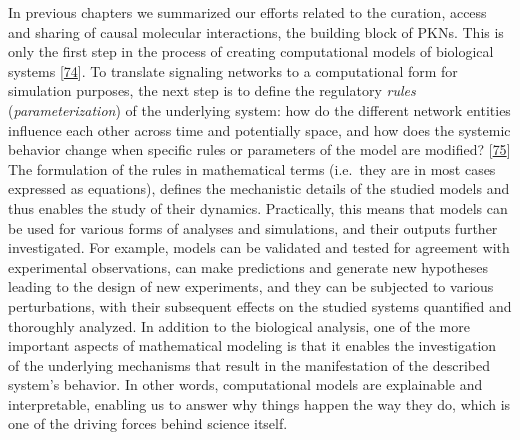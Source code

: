 \documentclass[
  12pt,
]{book}
\begin{document}
In previous chapters we summarized our efforts related to the curation, access and sharing of causal molecular interactions, the building block of PKNs.
This is only the first step in the process of creating computational models of biological systems {[}\protect\hyperlink{ref-Wang2012}{74}{]}.
To translate signaling networks to a computational form for simulation purposes, the next step is to define the regulatory \emph{rules} (\emph{parameterization}) of the underlying system: how do the different network entities influence each other across time and potentially space, and how does the systemic behavior change when specific rules or parameters of the model are modified? {[}\protect\hyperlink{ref-Aldridge2006}{75}{]}
The formulation of the rules in mathematical terms (i.e.~they are in most cases expressed as equations), defines the mechanistic details of the studied models and thus enables the study of their dynamics.
Practically, this means that models can be used for various forms of analyses and simulations, and their outputs further investigated.
For example, models can be validated and tested for agreement with experimental observations, can make predictions and generate new hypotheses leading to the design of new experiments, and they can be subjected to various perturbations, with their subsequent effects on the studied systems quantified and thoroughly analyzed.
In addition to the biological analysis, one of the more important aspects of mathematical modeling is that it enables the investigation of the underlying mechanisms that result in the manifestation of the described system's behavior.
In other words, computational models are explainable and interpretable, enabling us to answer why things happen the way they do, which is one of the driving forces behind science itself.
\end{document}
